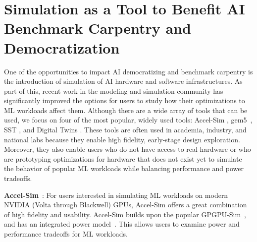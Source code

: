 \section{Simulation as a Tool to Benefit AI Benchmark Carpentry and Democratization}
\label{sec:sim}


One of the opportunities to impact AI democratizing and benchmark carpentry is the introduction of simulation of AI hardware and software infrastructures. 
As part of this, recent work in the modeling and simulation community has significantly improved the options for users to study how their optimizations to ML workloads affect them.
Although there are a wide array of tools that can be used, we focus on four of the most popular, widely used tools: Accel-Sim \cite{KhairyShen2021-accelSim}, gem5~\cite{binkert2011gem5, LowePowerAhmad2020-gem520}, SST \cite{RodriguesHemmert2011-sst, SST}, and Digital Twins \cite{brewer2024digital}.
These tools are often used in academia, industry, and national labs because they enable high fidelity, early-stage design exploration.
Moreover, they also enable users who do not have access to real hardware or who are prototyping optimizations for hardware that does not exist yet to simulate the behavior of popular ML workloads while balancing performance and power tradeoffs.

\noindent
\textbf{Accel-Sim}~\cite{KhairyShen2021-accelSim}: For users interested in simulating ML workloads on modern NVIDIA (Volta through Blackwell) GPUs, Accel-Sim offers a great combination of high fidelity and usability.
Accel-Sim builds upon the popular GPGPU-Sim~\cite{BakhodaYuan2009-gpgpuSim}, and has an integrated power model~\cite{KandiahPeverelle2021-accelWattch}.
This allows users to examine power and performance tradeoffs for ML workloads.

\begin{comment}
Originally, GPGPU-Sim supported running ML workloads natively: i.e., it required either direct access to the CUDA source code or access the underlying PTX (NVIDIA's virtual assembly language which is portable across GPUs) to run ML workloads~\cite{LewShah2018-gpgpusimML}.
\end{comment}

